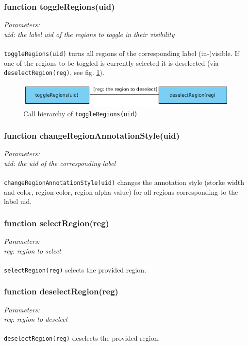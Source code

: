 \subsubsection{function toggleRegions(uid)}
\emph{Parameters:\\
	uid: the label uid of the regions to toggle in their visibility\\ \\
}
\texttt{toggleRegions(uid)} turns all regions of the corresponding label (in-)visible. If one of the regions to be toggled is currently selected it is deselected (via \texttt{deselectRegion(reg)}, see fig. \ref{figB_toggleRegions}).

\begin{figure}[H]
	\begin{center}
		\includegraphics[scale=0.5]{img/ch_toggleRegions.png}
		\caption{Call hierarchy of \texttt{toggleRegions(uid)}}
		\label{figB_toggleRegions}
	\end{center}
\end{figure}


\subsubsection{function changeRegionAnnotationStyle(uid)}
\emph{Parameters:\\
	uid: the uid of the corresponding label\\ \\
}
\texttt{changeRegionAnnotationStyle(uid)} changes the annotation style (storke width and color, region color, region alpha value) for all regions corresponding to the label uid.


\subsubsection{function selectRegion(reg)}
\emph{Parameters:\\
	reg: region to select\\ \\
}
\texttt{selectRegion(reg)} selects the provided region.


\subsubsection{function deselectRegion(reg)}
\emph{Parameters:\\
	reg: region to deselect\\ \\
}
\texttt{deselectRegion(reg)} deselects the provided region.


